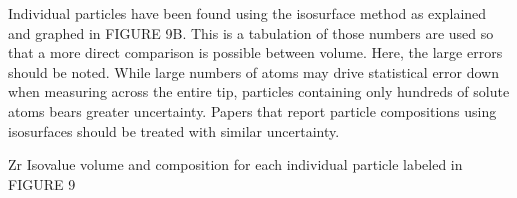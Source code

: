 


Individual particles have been found using the isosurface method as explained and graphed in FIGURE 9B. This is a tabulation of those numbers are used so that a more direct comparison is possible between volume. Here, the large errors should be noted. While large numbers of atoms may drive statistical error down when measuring across the entire tip, particles containing only hundreds of solute atoms bears greater uncertainty. Papers that report particle compositions using isosurfaces should be treated with similar uncertainty.

\begin{table}[]
	\caption{Zr Isovalue volume and composition for each individual particle labeled in FIGURE 9}
	
	\label{tab:Isoapp1}
\end{table}


